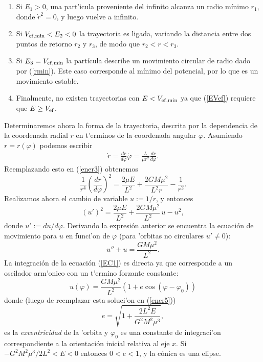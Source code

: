 \begin{enumerate}
\item Si $E_1>0$, una part'icula proveniente del infinito alcanza un radio
m\'inimo $r_1$, donde $\dot{r}^2=0$, y luego vuelve a infinito.

\item Si $V_{\rm ef, min}<E_2<0$ la trayectoria es ligada, variando la distancia entre dos puntos de retorno $r_2$ y $r_3$, de modo que $r_2<r<r_{3}$.

\item Si $E_{3}=V_{\rm ef, min}$ la part\'icula
describe un movimiento circular de radio dado por (\ref{rmin}). Este caso
corresponde al m\'inimo del potencial, por lo que es un
movimiento estable.

\item Finalmente, no existen trayectorias con $E<V_{\rm ef, min}$ ya que (\ref{EVef}) requiere que $E\ge V_{\rm ef}$.
\end{enumerate}

Determinaremos ahora la forma de la trayectoria, descrita por la dependencia de la coordenada radial $r$ en t'erminos de la coordenada angular $\varphi$. Asumiendo $r=r(\varphi)$ podemos escribir
\begin{eqnarray}
\dot{r}=\frac{dr}{d\varphi}\dot{\varphi}=\frac{L}{\mu r^2}\frac{dr}{d\varphi}.
\end{eqnarray}
Reemplazando esto en (\ref{ener3}) obtenemos
\begin{equation}
\frac{1}{r^4}\left(\frac{dr}{d\varphi}\right)^2=\frac{2\mu E}{L^2}+\frac{2GM\mu^2}{L^2r}-\frac{1}{r^2}.\label{ener4}
\end{equation}
Realizamos ahora el cambio de variable $u:=1/r$, y entonces
    \begin{equation}
    (u')^2=\frac{2\mu E}{L^2}+\frac{2GM\mu^2}{L^2}\,u-u^{2
    },\label{ener5}
    \end{equation}
donde $u':=du/d\varphi$. Derivando la expresi\'on anterior se encuentra la ecuaci\'on de
movimiento para $u$ en funci'on de $\varphi$ (para 'orbitas no circulares $u'\neq 0$):
\begin{equation}
u''+u=\frac{GM\mu^2}{L^2}.\label{EC1}
\end{equation}
La integraci\'on de la ecuaci\'on (\ref{EC1}) es directa ya que corresponde a un oscilador arm'onico con un t'ermino forzante constante:
\begin{equation}
u(\varphi)=\frac{GM\mu^2}{L^2}\left(1+e\cos
(\varphi-\varphi_0)\right)\label{CON1}
\end{equation}
donde (luego de reemplazar esta soluci'on en (\ref{ener5}))
\begin{equation}
e=\sqrt{1+\frac{2L^2E}{G^2M^2\mu^3}}, \label{ex}
\end{equation}
es la \textit{excentricidad} de la 'orbita y $\varphi_0$ es una constante de
integraci'on correspondiente a la orientaci\'on inicial relativa al eje
$x$. Si $-G^2M^2\mu^3/2L^2<E<0$ entonces $0<e<1$, y la
c\'onica es una elipse.

